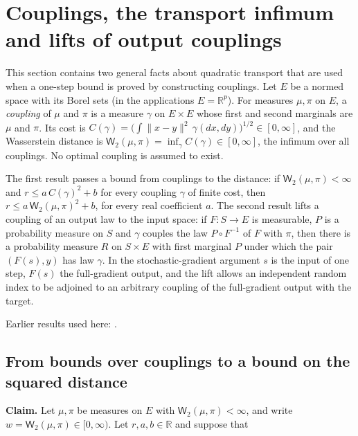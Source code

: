 \documentclass[11pt,a4paper]{report}
\begin{document}
\section{\texorpdfstring{Couplings, the transport infimum and lifts of output couplings}{Couplings, the transport infimum and lifts of output couplings}}
\label{proof-module-AverageLMC-SquaredTransport-lean}


This section contains two general facts about quadratic transport that are used when a one-step bound is proved by constructing couplings. Let \(E\) be a normed space with its Borel sets (in the applications \(E=\mathbb R^p\)). For measures \(\mu,\pi\) on \(E\), a \emph{coupling} of \(\mu\) and \(\pi\) is a measure \(\gamma\) on \(E\times E\) whose first and second marginals are \(\mu\) and \(\pi\). Its cost is \(C(\gamma)=\bigl(\int\|x-y\|^2\,\gamma(dx,dy)\bigr)^{1/2}\in[0,\infty]\), and the Wasserstein distance is \(\mathsf W_2(\mu,\pi)=\inf_\gamma C(\gamma)\in[0,\infty]\), the infimum over all couplings. No optimal coupling is assumed to exist.




The first result passes a bound from couplings to the distance: if \(\mathsf W_2(\mu,\pi)<\infty\) and \(r\le a\,C(\gamma)^2+b\) for every coupling \(\gamma\) of finite cost, then \(r\le a\,\mathsf W_2(\mu,\pi)^2+b\), for every real coefficient \(a\). The second result lifts a coupling of an output law to the input space: if \(F:S\to E\) is measurable, \(P\) is a probability measure on \(S\) and \(\gamma\) couples the law \(P\circ F^{-1}\) of \(F\) with \(\pi\), then there is a probability measure \(R\) on \(S\times E\) with first marginal \(P\) under which the pair \((F(s),y)\) has law \(\gamma\). In the stochastic-gradient argument \(s\) is the input of one step, \(F(s)\) the full-gradient output, and the lift allows an independent random index to be adjoined to an arbitrary coupling of the full-gradient output with the target.



Earlier results used here: \cite[Section~3.22]{LangevinLean2026ULASC}.
\subsection{\texorpdfstring{From bounds over couplings to a bound on the squared distance}{From bounds over couplings to a bound on the squared distance}}
\label{report-step-AverageLMC-SquaredTransport-lean-1}


\textbf{Claim.} Let \(\mu,\pi\) be measures on \(E\) with \(\mathsf W_2(\mu,\pi)<\infty\), and write \(w=\mathsf W_2(\mu,\pi)\in[0,\infty)\). Let \(r,a,b\in\mathbb R\) and suppose that
\end{document}
